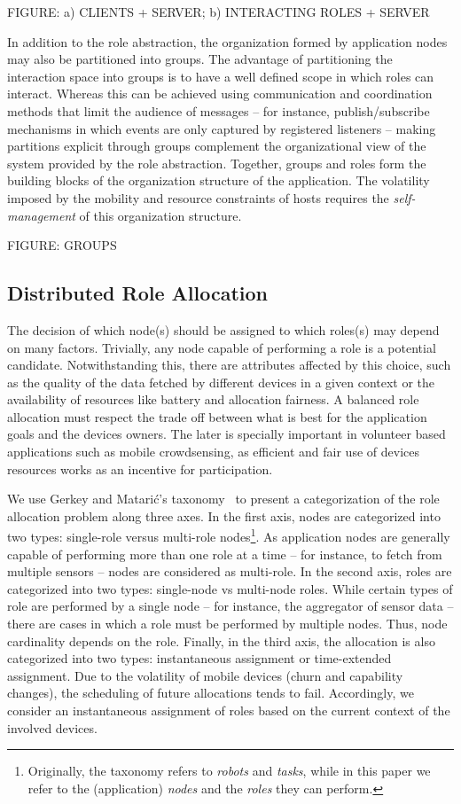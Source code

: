 FIGURE: a) CLIENTS + SERVER; b) INTERACTING ROLES + SERVER

In addition to the role abstraction, the organization formed by application nodes may also be partitioned into groups. The advantage of partitioning the interaction space into groups is to have a well defined scope in which roles can interact. Whereas this can be achieved using communication and coordination methods that limit the audience of messages -- for instance, publish/subscribe mechanisms in which events are only captured by registered listeners -- making partitions explicit through groups complement the organizational view of the system provided by the role abstraction. Together, groups and roles form the building blocks of the organization structure of the application. The volatility imposed by the mobility and resource constraints of hosts requires the \textit{self-management} of this organization structure.

FIGURE: GROUPS

\subsection{Distributed Role Allocation}
 
The decision of which node(s) should be assigned to which roles(s) may depend on many factors. Trivially, any node capable of performing a role is a potential candidate. Notwithstanding this, there are attributes affected by this choice, such as the quality of the data fetched by different devices in a given context or the availability of resources like battery and allocation fairness. A balanced role allocation must respect the trade off between what is best for the application goals and the devices owners. The later is specially important in volunteer based applications such as mobile crowdsensing, as efficient and fair use of devices resources works as an incentive for participation. 

We use Gerkey and Matarić’s taxonomy~\cite{} to present a categorization of the role allocation problem along three axes. In the first axis, nodes are categorized into two types: single-role versus multi-role nodes\footnote{Originally, the taxonomy refers to \textit{robots} and \textit{tasks}, while in this paper we refer to the (application) \textit{nodes} and the \textit{roles} they can perform.}. As application nodes are generally capable of performing more than one role at a time -- for instance, to fetch from multiple sensors -- nodes are considered as multi-role. In the second axis, roles are categorized into two types: single-node vs multi-node roles. While certain types of role are performed by a single node -- for instance, the aggregator of sensor data -- there are cases in which a role must be performed by multiple nodes. Thus, node cardinality depends on the role. Finally, in the third axis, the allocation is also categorized into two types: instantaneous assignment or time-extended assignment. Due to the volatility of mobile devices (churn and capability changes), the scheduling of future allocations tends to fail. Accordingly, we consider an instantaneous assignment of roles based on the current context of the involved devices.

